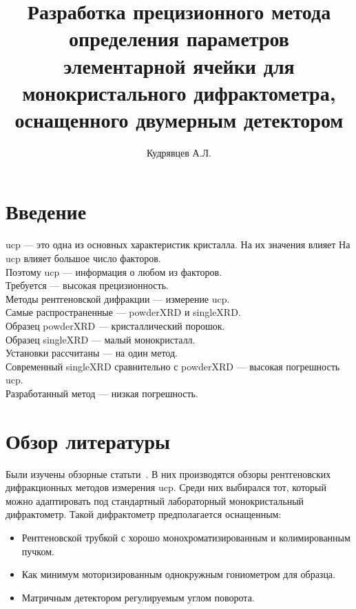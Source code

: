 \documentclass[a4paper, 12pt]{article}
\author{Кудрявцев А.Л.}
\title{Разработка прецизионного метода определения параметров элементарной ячейки для монокристального дифрактометра, оснащенного двумерным детектором}
\begin{document}
\maketitle
\newpage
\tableofcontents
\newpage

\section{Введение}

\gls{ucp} --- это одна из основных характеристик кристалла. На их значения влияет 
На \gls{ucp} влияет большое число факторов. \\
Поэтому \gls{ucp} --- информация о любом из факторов. \\
Требуется --- высокая прецизионность. \\
Методы рентгеновской дифракции --- измерение \gls{ucp}. \\
Самые распространенные --- \gls{powderXRD} и \gls{singleXRD}. \\
Образец \gls{powderXRD} --- кристаллический порошок. \\
Образец \gls{singleXRD} --- малый монокристалл. \\
Установки рассчитаны --- на один метод. \\
Современный \gls{singleXRD} сравнительно с \gls{powderXRD} --- высокая погрешность \gls{ucp}. \\
Разработанный метод --- низкая погрешность.

\section{Обзор литературы}
Были изучены обзорные статьти~\cite{Lider:2020,Galdecka:2006}.
В них производятся обзоры рентгеновских дифракционных методов измерения \gls{ucp}.
Среди них выбирался тот, который можно адаптировать под стандартный лабораторный монокристальный дифрактометр.
Такой дифрактометр предполагается оснащенным:
\begin{itemize}
    \item Рентгеновской трубкой с хорошо монохроматизированным и колимированным пучком.
    \item Как минимум моторизированным однокружным гониометром для образца.
    \item Матричным детектором регулируемым углом поворота.
\end{itemize}
\end{document}
